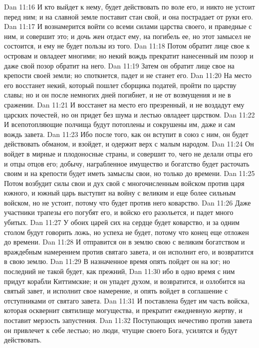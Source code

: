 \vs Dan 11:16 И кто выйдет к нему, будет действовать по воле его, и никто не устоит перед ним; и на славной земле поставит стан свой, и она пострадает от руки его.
\vs Dan 11:17 И вознамерится войти со всеми силами царства своего, и праведные с ним, и совершит это; и дочь жен отдаст ему, на погибель ее, но этот замысел не состоится, и ему не будет пользы из того.
\vs Dan 11:18 Потом обратит лице свое к островам и овладеет многими; но некий вождь прекратит нанесенный им позор и даже свой позор обратит на него.
\vs Dan 11:19 Затем он обратит лице свое на крепости своей земли; но споткнется, падет и не станет его.
\vs Dan 11:20 На место его восстанет некий, который пошлет сборщика податей, пройти по царству славы; но и он после немногих дней погибнет, и не от возмущения и не в сражении.
\vs Dan 11:21 И восстанет на место его презренный, и не воздадут ему царских почестей, но он придет без шума и лестью овладеет царством.
\vs Dan 11:22 И всепотопляющие полчища будут потоплены и сокрушены им, даже и сам вождь завета.
\vs Dan 11:23 Ибо после того, как он вступит в союз с ним, он будет действовать обманом, и взойдет, и одержит верх с малым народом.
\vs Dan 11:24 Он войдет в мирные и плодоносные страны, и совершит то, чего не делали отцы его и отцы отцов его; добычу, награбленное имущество и богатство будет расточать своим и на крепости будет иметь замыслы свои, но только до времени.
\vs Dan 11:25 Потом возбудит силы свои и дух свой с многочисленным войском против царя южного, и южный царь выступит на войну с великим и еще более сильным войском, но не устоит, потому что будет против него коварство.
\vs Dan 11:26 Даже участники трапезы его погубят его, и войско его разольется, и падет много убитых.
\vs Dan 11:27 У обоих царей сих на сердце будет коварство, и за одним столом будут говорить ложь, но успеха не будет, потому что конец еще отложен до времени.
\vs Dan 11:28 И отправится он в землю свою с великим богатством и враждебным намерением против святаго завета, и он исполнит его, и возвратится в свою землю.
\vs Dan 11:29 В назначенное время опять пойдет он на юг; но последний  не такой будет, как прежний,
\vs Dan 11:30 ибо в одно время с ним придут корабли Киттимские; и он упадет духом, и возвратится, и озлобится на святый завет, и исполнит свое намерение, и опять войдет в соглашение с отступниками от святаго завета.
\vs Dan 11:31 И поставлена будет им часть войска, которая осквернит святилище могущества, и прекратит ежедневную жертву, и поставит мерзость запустения.
\vs Dan 11:32 Поступающих нечестиво против завета он привлечет к себе лестью; но люди, чтущие своего Бога, усилятся и будут действовать.
